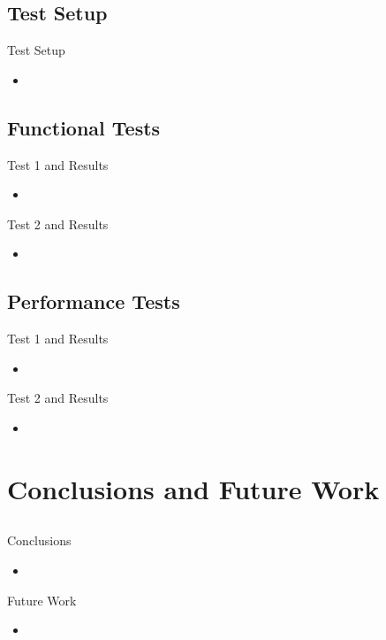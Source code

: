 \documentclass{beamer}
\begin{document}
\subsection{Test Setup}

\begin{frame}{Test Setup}
	\begin{itemize}
		\item 
	\end{itemize}
\end{frame}


\subsection{Functional Tests} 

\begin{frame}{Test 1 and Results}
	\begin{itemize}
		\item 
	\end{itemize}
\end{frame}

\begin{frame}{Test 2 and Results}
	\begin{itemize}
		\item 
	\end{itemize}
\end{frame}


\subsection{Performance Tests}

\begin{frame}{Test 1 and Results}
	\begin{itemize}
		\item 
	\end{itemize}
\end{frame}

\begin{frame}{Test 2 and Results}
	\begin{itemize}
		\item 
	\end{itemize}
\end{frame}


\section{Conclusions and Future Work}

\subsection*{}

\begin{frame}{Conclusions}
	\begin{itemize}
		\item 
	\end{itemize}
\end{frame}

\begin{frame}{Future Work}
	\begin{itemize}
		\item 
	\end{itemize}
\end{frame}
\end{document}
